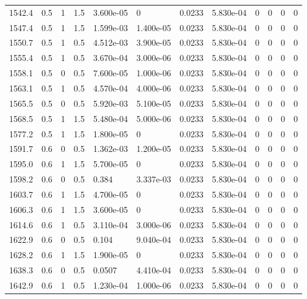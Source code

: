 \documentclass[preview]{standalone}
\begin{document}
{{{{{{{{\begin{tabular}{L{1.2cm}C{1.2cm} C{0.3cm}C{0.5cm} C{1.4cm}C{1.4cm} C{1.4cm}C{1.4cm} C{1.6cm}C{1.6cm} C{1.6cm}C{1.6cm}}
  1542.4  &   0.5  & 1     & 1.5 &  3.600e-05  & 0  &  0.0233&   5.830e-04& 0 & 0   &  0 & 0  \\ 
  1547.4  &   0.5  & 1     & 1.5 &  1.599e-03  & 1.400e-05  &  0.0233&   5.830e-04& 0 & 0   &  0 & 0  \\ 
  1550.7  &   0.5  & 1     & 0.5 &  4.512e-03  & 3.900e-05  &  0.0233&   5.830e-04& 0 & 0   &  0 & 0  \\ 
  1555.4  &   0.5  & 1     & 0.5 &  3.670e-04  & 3.000e-06  &  0.0233&   5.830e-04& 0 & 0   &  0 & 0  \\ 
  1558.1  &   0.5  & 0     & 0.5 &  7.600e-05  & 1.000e-06  &  0.0233&   5.830e-04& 0 & 0   &  0 & 0  \\ 
  1563.1  &   0.5  & 1     & 0.5 &  4.570e-04  & 4.000e-06  &  0.0233&   5.830e-04& 0 & 0   &  0 & 0  \\ 
  1565.5  &   0.5  & 0     & 0.5 &  5.920e-03  & 5.100e-05  &  0.0233&   5.830e-04& 0 & 0   &  0 & 0  \\ 
  1568.5  &   0.5  & 1     & 1.5 &  5.480e-04  & 5.000e-06  &  0.0233&   5.830e-04& 0 & 0   &  0 & 0  \\ 
  1577.2  &   0.5  & 1     & 1.5 &  1.800e-05  & 0  &  0.0233&   5.830e-04& 0 & 0   &  0 & 0  \\ 
  1591.7  &   0.6  & 0     & 0.5 &  1.362e-03  & 1.200e-05  &  0.0233&   5.830e-04& 0 & 0   &  0 & 0  \\ 
  1595.0  &   0.6  & 1     & 1.5 &  5.700e-05  & 0  &  0.0233&   5.830e-04& 0 & 0   &  0 & 0  \\ 
  1598.2  &   0.6  & 0     & 0.5 &  0.384  & 3.337e-03  &  0.0233&   5.830e-04& 0 & 0   &  0 & 0  \\ 
  1603.7  &   0.6  & 1     & 1.5 &  4.700e-05  & 0  &  0.0233&   5.830e-04& 0 & 0   &  0 & 0  \\ 
  1606.3  &   0.6  & 1     & 1.5 &  3.600e-05  & 0  &  0.0233&   5.830e-04& 0 & 0   &  0 & 0  \\ 
  1614.6  &   0.6  & 1     & 0.5 &  3.110e-04  & 3.000e-06  &  0.0233&   5.830e-04& 0 & 0   &  0 & 0  \\ 
  1622.9  &   0.6  & 0     & 0.5 &  0.104  & 9.040e-04  &  0.0233&   5.830e-04& 0 & 0   &  0 & 0  \\ 
  1628.2  &   0.6  & 1     & 1.5 &  1.900e-05  & 0  &  0.0233&   5.830e-04& 0 & 0   &  0 & 0  \\ 
  1638.3  &   0.6  & 0     & 0.5 &  0.0507  & 4.410e-04  &  0.0233&   5.830e-04& 0 & 0   &  0 & 0  \\ 
  1642.9  &   0.6  & 1     & 0.5 &  1.230e-04  & 1.000e-06  &  0.0233&   5.830e-04& 0 & 0   &  0 & 0  \\ 

\end{tabular}}}}}}}}}
\end{document}
